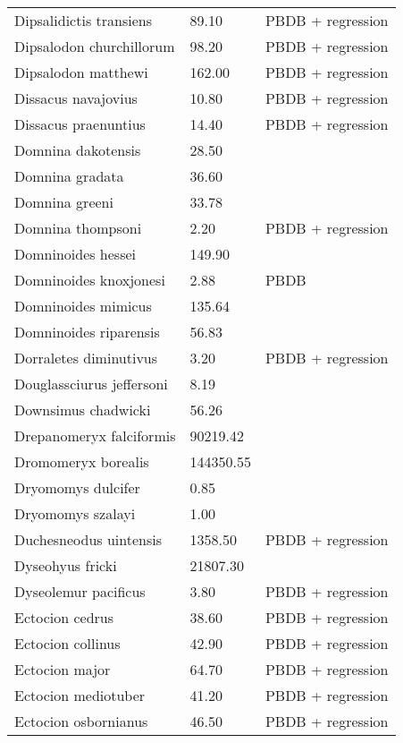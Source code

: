 \documentclass{article}
\begin{document}
\begin{center}
\begin{longtable}{p{} p{} p{}}
    Dipsalidictis transiens & 89.10 & PBDB + regression \\ 
    Dipsalodon churchillorum & 98.20 & PBDB + regression \\ 
    Dipsalodon matthewi & 162.00 & PBDB + regression \\ 
    Dissacus navajovius & 10.80 & PBDB + regression \\ 
    Dissacus praenuntius & 14.40 & PBDB + regression \\ 
    Domnina dakotensis & 28.50 & \cite{Tomiya2013} \\ 
    Domnina gradata & 36.60 & \cite{Tomiya2013} \\ 
    Domnina greeni & 33.78 & \cite{Tomiya2013} \\ 
    Domnina thompsoni & 2.20 & PBDB + regression \\ 
    Domninoides hessei & 149.90 & \cite{Tomiya2013} \\ 
    Domninoides knoxjonesi & 2.88 & PBDB \\ 
    Domninoides mimicus & 135.64 & \cite{Tomiya2013} \\ 
    Domninoides riparensis & 56.83 & \cite{Tomiya2013} \\ 
    Dorraletes diminutivus & 3.20 & PBDB + regression \\ 
    Douglassciurus jeffersoni & 8.19 & \cite{Mihlbachler2006} \\ 
    Downsimus chadwicki & 56.26 & \cite{Tomiya2013} \\ 
    Drepanomeryx falciformis & 90219.42 & \cite{Tomiya2013} \\ 
    Dromomeryx borealis & 144350.55 & \cite{Tomiya2013} \\ 
    Dryomomys dulcifer & 0.85 & \cite{Novacek1977} \\ 
    Dryomomys szalayi & 1.00 & \cite{Novacek1977} \\ 
    Duchesneodus uintensis & 1358.50 & PBDB + regression \\ 
    Dyseohyus fricki & 21807.30 & \cite{Tomiya2013} \\ 
    Dyseolemur pacificus & 3.80 & PBDB + regression \\ 
    Ectocion cedrus & 38.60 & PBDB + regression \\ 
    Ectocion collinus & 42.90 & PBDB + regression \\ 
    Ectocion major & 64.70 & PBDB + regression \\ 
    Ectocion mediotuber & 41.20 & PBDB + regression \\ 
    Ectocion osbornianus & 46.50 & PBDB + regression \\ 

\end{longtable}
\end{center}
\end{document}
